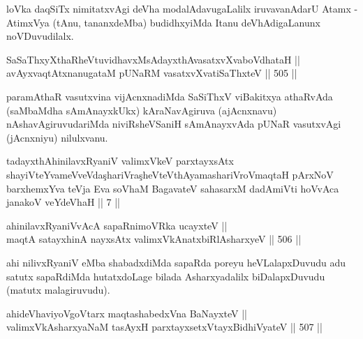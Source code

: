 \begin{artha}
loVka daqSiTx nimitatxvAgi deVha modalAdavugaLalilx iruvavanAdarU
Atamx - AtimxVya (tAnu, tananxdeMba) budidhxyiMda Itanu
deVhAdigaLanunx noVDuvudilalx.
\end{artha}


\begin{shl}
SaSaThxyXthaRheVtuvidhavxMsAdayxthAvasatxvXvaboVdhataH || \\
avAyxvaqtAtxnanugataM pUNaRM vasatxvXvatiSaThxteV \hfill || 505 ||  
\end{shl}

\begin{artha}
paramAthaR vasutxvina vijAcnxnadiMda SaSiThxV viBakitxya athaRvAda
(saMbaMdha sAmAnayxkUkx) kAraNavAgiruva (ajAcnxnavu)
nAshavAgiruvudariMda niviRsheVSaniH sAmAnayxvAda pUNaR vasutxvAgi
(jAcnxniyu) nilulxvanu.
\end{artha}

\begin{kandikeshl}
tadayxthA\s hinilavxRyaniV valimxVkeV parxtayxsAtx shayiVteYvameVveVda\c  shariVra\c  sheVteV\s thAyamashariVroV\s maqtaH pArxNoV barxhemxYva teVja Eva soV\s haM BagavateV sahasarxM dadAmiVti hoVvAca janakoV veYdeVhaH || 7 ||
\end{kandikeshl}


\begin{shl}
ahinilavxRyaniVvAcA sapaRnimoVRka ucayxteV || \\
maqtA satayxhinA nayxsAtx valimxVkAnatxbiRlAsharxyeV \hfill || 506 ||
\end{shl}

\begin{artha}
ahi nilivxRyaniV eMba shabadxdiMda sapaRda poreyu heVLalapxDuvudu adu
satutx sapaRdiMda hutatxdoLage bilada Asharxyadalilx biDalapxDuvudu
(matutx malagiruvudu).
\end{artha}

\begin{shl}
ahideVhaviyoVgoV\s tarx maqtashabedxVna BaNayxteV || \\
valimxVkAsharxyaNaM tasAyxH parxtayxsetxVtayxBidhiVyateV \hfill || 507 ||  
\end{shl}

